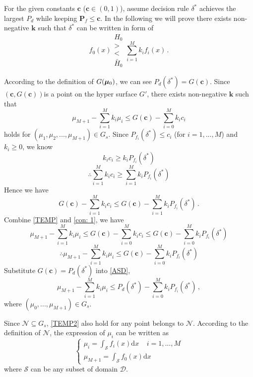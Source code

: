 For the given constants $\mathbf{c}$ ($\mathbf{c} \in (0, 1)$), 
 assume decision rule $\delta^\ast$  achieves the largest $P_d$  while keeping $\mathbf{P}_f \leq \mathbf{c}$. In the following we will prove there exists non-negative $\mathbf{k}$  such that $\delta^\ast$ can be written in form of 
\[
f_0(x) \substack{H_0 \\ > \\ < \\ \bar{H}_0 } \sum_{i=1}^{M}k_if_i(x)\,.
\]

According to the definition of $G(\boldsymbol{\mu}_0)$, we can see $P_d(\delta^\ast) = G(\mathbf{c})$. Since $(\mathbf{c}, G(\mathbf{c}))$is a point on the hyper surface $G'$,  there exists non-negative $\mathbf{k}$ such that 
\begin{equation}
\label{TEMP}
\mu_{M+1} - \sum_{i=1}^{M}k_i\mu_i \leq G(\mathbf{c}) - \sum_{i=0}^{M}k_ic_i
\end{equation}
holds for $(\mu_1, \mu_2, ..., \mu_{M+1}) \in G_s$.
Since $P_{f_i}(\delta^\ast) \leq c_i$ (for $i=1, ..., M$) and $k_i \geq 0$, we know
\[
k_ic_i \geq k_iP_{f_i}(\delta^\ast)
\]
\[
\therefore \sum_{i=1}^{M}k_ic_i \geq \sum_{i=1}^{M}k_iP_{f_i}(\delta^\ast)
\]
Hence we have
\begin{equation}
\label{con: 1}
G(\mathbf{c}) - \sum_{i=1}^{M}k_ic_i \leq G(\mathbf{c}) - \sum_{i=1}^{M}k_iP_{f_i}(\delta^\ast)\,.
\end{equation}
Combine \eqref{TEMP} and \eqref{con: 1}, we have 
\begin{equation}
\label{equ: TEMP3}
\mu_{M+1} - \sum_{i=1}^{M}k_i\mu_i \leq G(\mathbf{c}) - \sum_{i=0}^{M}k_ic_i \leq G(\mathbf{c}) - \sum_{i=0}^{M}k_iP_{f_i}(\delta^\ast)
\end{equation}
\begin{equation}
\label{ASD}
\therefore \mu_{M+1} - \sum_{i=1}^{M}k_i\mu_i \leq G(\mathbf{c}) - \sum_{i=0}^{M}k_iP_{f_i}(\delta^\ast)
\end{equation}
Substitute $G(\mathbf{c}) = P_d(\delta^\ast)$ into \eqref{ASD}, 
\begin{equation}
\label{TEMP2}
\mu_{M+1} - \sum_{i=1}^{M}k_i\mu_i \leq P_d(\delta^\ast) - \sum_{i=0}^{M}k_iP_{f_i}(\delta^\ast)\,,
\end{equation}
where $(\mu_0, ..., \mu_{M+1}) \in G_s$.

Since $\mathcal{N} \subseteq G_s$, \eqref{TEMP2} also hold for any point belongs to $\mathcal{N}$.
According to the definition of $\mathcal{N}$, the expression of $\mu_i$  can be written as 
\begin{equation}
\label{def: mu}
\begin{cases}
\mu_i = \int_{\mathcal{S}}f_i(x)\mathrm{d}x \;\;\;\;i = 1, ..., M\\
\mu_{M+1} = \int_{\mathcal{S}}f_{0}(x)\mathrm{d}x
\end{cases}
\end{equation}
where $\mathcal{S}$ can be any subset of domain $\mathcal{D}$. 

